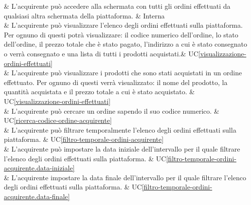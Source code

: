  & L'acquirente può accedere alla schermata con tutti gli ordini effettuati da qualsiasi altra schermata della piattaforma. & Interna \\

 & L'acquirente può visualizzare l'elenco degli ordini effettuati sulla piattaforma. Per ognuno di questi potrà visualizzare: il codice numerico dell'ordine, lo stato dell'ordine, il prezzo totale che è stato pagato, l'indirizzo a cui è stato consegnato o verrà consegnato e una lista di tutti i prodotti acquistati.& UC\ref{visualizzazione-ordini-effettuati} \\

 & L'acquirente può visualizzare i prodotti che sono stati acquistati in un ordine effettuato. Per ognuno di questi verrà visualizzato: il nome del prodotto, la quantità acquistata e il prezzo totale a cui è stato acquistato. & UC\ref{visualizzazione-ordini-effettuati} \\

 & L'acquirente può cercare un ordine sapendo il suo codice numerico. & UC\ref{ricerca-codice-ordine-acquirente} \\

 & L'acquirente può filtrare temporalmente l'elenco degli ordini effettuati sulla piattaforma. & UC\ref{filtro-temporale-ordini-acquirente} \\

 & L'acquirente può impostare la data iniziale dell'intervallo per il quale filtrare l'elenco degli ordini effettuati sulla piattaforma. & UC\ref{filtro-temporale-ordini-acquirente.data-iniziale} \\

 & L'acquirente impostare la data finale dell'intervallo per il quale filtrare l'elenco degli ordini effettuati sulla piattaforma. & UC\ref{filtro-temporale-ordini-acquirente.data-finale} \\

